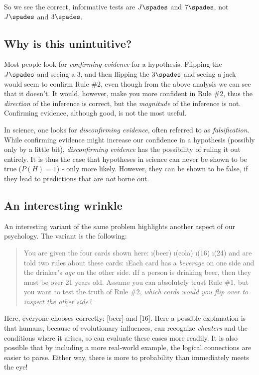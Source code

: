 \documentclass[12pt]{tufte-book}
\begin{document}
So we see the correct, informative tests are $J\spades$ and $7\spades$, not $J\spades$ and $3\spades$.  

\subsection{Why is this unintuitive?}

Most people look for {\em confirming evidence} for a hypothesis.  Flipping the $J\spades$ and seeing a 3, and then flipping the $3\spades$ and seeing a jack would seem to confirm Rule \#2, even though from the above analysis we can see that it doesn't.  It would, however, make you more confident in Rule \#2, thus the {\em direction} of the inference is correct, but the {\em magnitude} of the inference is not.  Confirming evidence, although good, is not the most useful.

In science, one looks for {\em disconfirming evidence}, often referred to as {\em falsification}.  While confirming evidence might increase our confidence in a hypothesis (possibly only by a little bit), {\em disconfirming evidence} has the possibility of ruling it out entirely.  It is thus the case that hypotheses in science can never be shown to be true ($P(H)=1$) - only more likely.  However, they can be shown to be false, if they lead to predictions that are {\em not} borne out.  

\subsection{An interesting wrinkle}

An interesting variant of the same problem highlights another aspect of our psychology.  The variant is the following:
\begin{quote}
You are given the four cards shown here:
\be
\i (beer)
\i (cola)
\i (16)
\i (24)
\ee
and are told two rules about these cards:
\be
\i Each card has a {\em beverage} on one side and the drinker's {\em age}  on the other side.
\i If a person is drinking beer, then they must be over 21 years old. 
\ee
Assume you can absolutely trust Rule \#1, but you want to test the truth of Rule \#2, {\em which cards would you flip over to inspect the other side?}
\end{quote}
Here, everyone chooses correctly: [beer] and [16].  Here a possible explanation is that humans, because of evolutionary influences, can recognize {\em cheaters} and the conditions where it arises, so can evaluate these cases more readily.  It is also possible that by including a more real-world example, the logical connections are easier to parse.  Either way, there is more to probability than immediately meets the eye!
\end{document}
